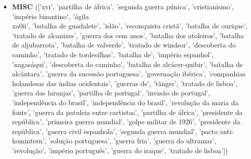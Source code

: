 \documentclass{article}
\begin{document}
\begin{itemize}
\item \textbf{MISC} (['xvi', 'partilha de áfrica', 'segunda guerra púnica', 'cristianismo', 'império bizantino', 'ágila\\xa0ii', 'batalha de guadalete', 'islão', 'reconquista cristã', 'batalha de ourique', 'tratado de alcanizes', 'guerra dos cem anos', 'batalha dos atoleiros', 'batalha de aljubarrota', 'batalha de valverde', 'tratado de windsor', 'descoberta do caminho', 'tratado de tordesilhas', 'batalha de', 'império espanhol', 'nagasáqui', 'descoberta do caminho', 'batalha de alcácer-quibir', 'batalha de alcântara', 'guerra da sucessão portuguesa', 'governação ibérica', 'companhias holandesas das índias ocidentais', 'guerras de', 'tânger', 'tratado de lisboa', 'guerra das laranjas', 'partilha de portugal', 'invasão de portugal', 'independência do brasil', 'independência do brasil', 'revolução da maria da fonte', 'guerra da patuleia entre cartistas', 'partilha de áfrica', 'presidente da república', 'primeira guerra mundial', 'golpe militar de 1926', 'presidente da república', 'guerra civil espanhola', 'segunda guerra mundial', 'pacto anti-komintern', 'solução portuguesa', 'guerra fria', 'guerra do ultramar', 'revolução', 'império português', 'guerra do iraque', 'tratado de lisboa'])

\end{itemize}
\end{document}
